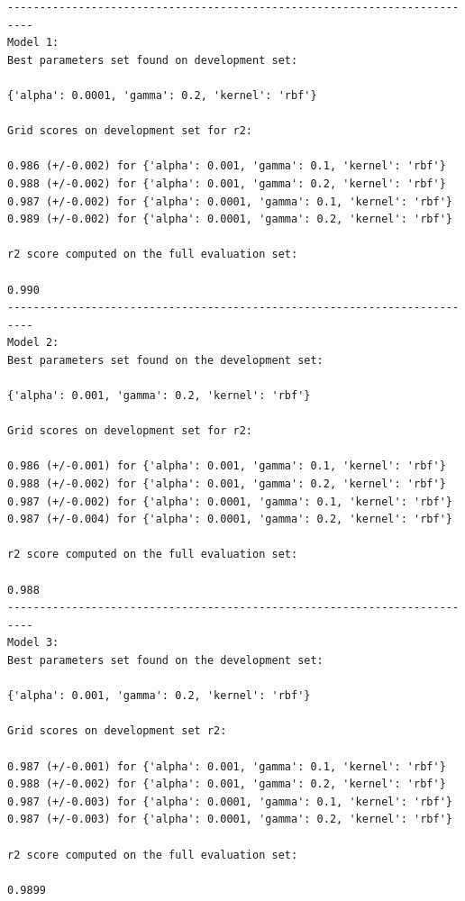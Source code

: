 \begin{verbatim}
--------------------------------------------------------------------------
Model 1:
Best parameters set found on development set:

{'alpha': 0.0001, 'gamma': 0.2, 'kernel': 'rbf'}

Grid scores on development set for r2:

0.986 (+/-0.002) for {'alpha': 0.001, 'gamma': 0.1, 'kernel': 'rbf'}
0.988 (+/-0.002) for {'alpha': 0.001, 'gamma': 0.2, 'kernel': 'rbf'}
0.987 (+/-0.002) for {'alpha': 0.0001, 'gamma': 0.1, 'kernel': 'rbf'}
0.989 (+/-0.002) for {'alpha': 0.0001, 'gamma': 0.2, 'kernel': 'rbf'}

r2 score computed on the full evaluation set:

0.990
--------------------------------------------------------------------------
Model 2:
Best parameters set found on the development set:

{'alpha': 0.001, 'gamma': 0.2, 'kernel': 'rbf'}

Grid scores on development set for r2:

0.986 (+/-0.001) for {'alpha': 0.001, 'gamma': 0.1, 'kernel': 'rbf'}
0.988 (+/-0.002) for {'alpha': 0.001, 'gamma': 0.2, 'kernel': 'rbf'}
0.987 (+/-0.002) for {'alpha': 0.0001, 'gamma': 0.1, 'kernel': 'rbf'}
0.987 (+/-0.004) for {'alpha': 0.0001, 'gamma': 0.2, 'kernel': 'rbf'}

r2 score computed on the full evaluation set:

0.988
--------------------------------------------------------------------------
Model 3:
Best parameters set found on the development set:

{'alpha': 0.001, 'gamma': 0.2, 'kernel': 'rbf'}

Grid scores on development set r2:

0.987 (+/-0.001) for {'alpha': 0.001, 'gamma': 0.1, 'kernel': 'rbf'}
0.988 (+/-0.002) for {'alpha': 0.001, 'gamma': 0.2, 'kernel': 'rbf'}
0.987 (+/-0.003) for {'alpha': 0.0001, 'gamma': 0.1, 'kernel': 'rbf'}
0.987 (+/-0.003) for {'alpha': 0.0001, 'gamma': 0.2, 'kernel': 'rbf'}

r2 score computed on the full evaluation set:

0.9899

\end{verbatim}
